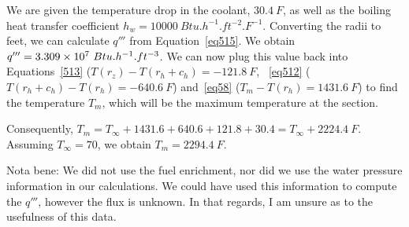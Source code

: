 We are given the temperature drop in the coolant, $30.4\ F$, as well as the boiling heat transfer coefficient $h_w = 10000\ Btu.h^{-1}.ft^{-2}.F^{-1}$. Converting the radii to feet, we can calculate $q'''$ from Equation~\ref{eq515}. We obtain $q''' = \text{\num{3.309e7}}\ Btu.h^{-1}.ft^{-3}$. We can now plug this value back into Equations~\ref{513} ($T(r_z)-T(r_h+c_h) = -121.8\ F$, ~\ref{eq512} ($T(r_h+c_h)-T(r_h) = -640.6\ F$) and~\ref{eq58} ($T_m - T(r_h) = 1431.6\ F$) to find the temperature $T_m$, which will be the maximum temperature at the section.

Consequently, $T_m = T_{\infty} + 1431.6 + 640.6 + 121.8 + 30.4 = T_{\infty} + 2224.4\ F$. Assuming $T_{\infty} = 70$, we obtain $T_m = 2294.4\ F$.


Nota bene: We did not use the fuel enrichment, nor did we use the water pressure information in our calculations. We could have used this information to compute the $q'''$, however the flux is unknown. In that regards, I am unsure as to the usefulness of this data.


